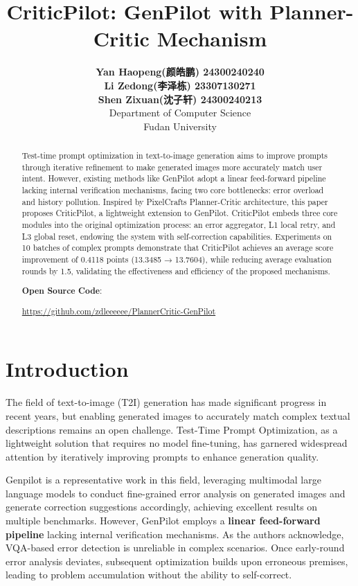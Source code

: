 \documentclass[UTF8]{article} %
\title{CriticPilot: GenPilot with Planner-Critic Mechanism}
\author{
\textbf{Yan Haopeng(颜皓鹏) 24300240240} \\
\textbf{Li Zedong(李泽栋) 23307130271} \\
\textbf{Shen Zixuan(沈子轩) 24300240213} \\
Department of Computer Science \\
Fudan University
}
\begin{document}
\iclrfinalcopy

\maketitle

\begin{abstract}

Test-time prompt optimization in text-to-image generation aims to
improve prompts through iterative refinement to make generated images
more accurately match user intent. However, existing methods like
GenPilot adopt a linear feed-forward pipeline lacking internal
verification mechanisms, facing two core bottlenecks: error overload and
history pollution. Inspired by PixelCraft\textquotesingle s
Planner-Critic architecture, this paper proposes CriticPilot, a
lightweight extension to GenPilot. CriticPilot embeds three core modules
into the original optimization process: an error aggregator, L1 local
retry, and L3 global reset, endowing the system with self-correction
capabilities. Experiments on 10 batches of complex prompts demonstrate
that CriticPilot achieves an average score improvement of 0.4118 points
(13.3485 → 13.7604), while reducing average evaluation rounds by 1.5,
validating the effectiveness and efficiency of the proposed mechanisms.

\textbf{Open Source Code}:

\url{https://github.com/zdleeeeee/PlannerCritic-GenPilot}

\end{abstract}

\section{Introduction}\label{introduction}

The field of text-to-image (T2I) generation has made significant
progress in recent years, but enabling generated images to accurately
match complex textual descriptions remains an open challenge. Test-Time
Prompt Optimization, as a lightweight solution that requires no model
fine-tuning, has garnered widespread attention by iteratively improving
prompts to enhance generation quality.

Genpilot \cite{ye2025genpilotmultiagenttesttimeprompt} is a representative work in this field,
leveraging multimodal large language models to conduct fine-grained
error analysis on generated images and generate correction suggestions
accordingly, achieving excellent results on multiple benchmarks.
However, GenPilot employs a \textbf{linear feed-forward pipeline}
lacking internal verification mechanisms. As the authors acknowledge,
VQA-based error detection is unreliable in complex scenarios. Once
early-round error analysis deviates, subsequent optimization builds upon
erroneous premises, leading to problem accumulation without the ability
to self-correct.
\end{document}
